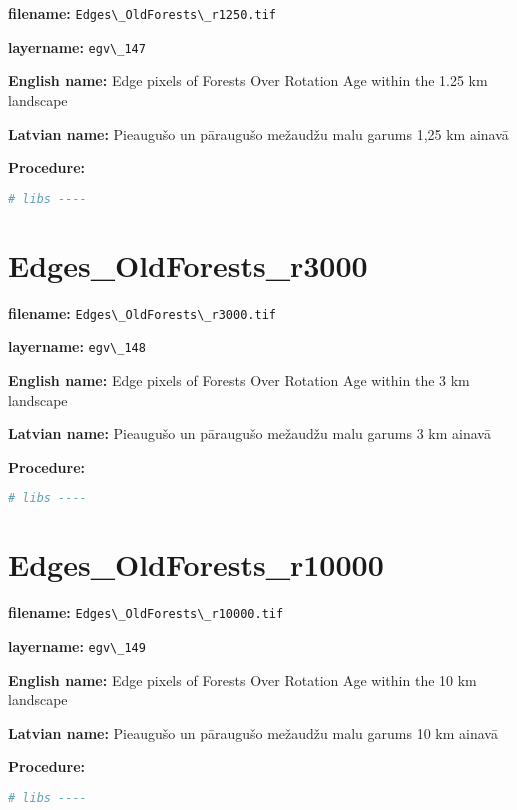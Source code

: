 \documentclass[
]{book}
\newcommand{\passthrough}[1]{#1}
\begin{document}
\textbf{filename:} \passthrough{\lstinline!Edges\_OldForests\_r1250.tif!}

\textbf{layername:} \passthrough{\lstinline!egv\_147!}

\textbf{English name:} Edge pixels of Forests Over Rotation Age within the 1.25 km landscape

\textbf{Latvian name:} Pieaugušo un pāraugušo mežaudžu malu garums 1,25 km ainavā

\textbf{Procedure:}

\begin{lstlisting}[language=R]
# libs ----
\end{lstlisting}

\section{Edges\_OldForests\_r3000}\label{ch06.148}

\textbf{filename:} \passthrough{\lstinline!Edges\_OldForests\_r3000.tif!}

\textbf{layername:} \passthrough{\lstinline!egv\_148!}

\textbf{English name:} Edge pixels of Forests Over Rotation Age within the 3 km landscape

\textbf{Latvian name:} Pieaugušo un pāraugušo mežaudžu malu garums 3 km ainavā

\textbf{Procedure:}

\begin{lstlisting}[language=R]
# libs ----
\end{lstlisting}

\section{Edges\_OldForests\_r10000}\label{ch06.149}

\textbf{filename:} \passthrough{\lstinline!Edges\_OldForests\_r10000.tif!}

\textbf{layername:} \passthrough{\lstinline!egv\_149!}

\textbf{English name:} Edge pixels of Forests Over Rotation Age within the 10 km landscape

\textbf{Latvian name:} Pieaugušo un pāraugušo mežaudžu malu garums 10 km ainavā

\textbf{Procedure:}

\begin{lstlisting}[language=R]
# libs ----
\end{lstlisting}
\end{document}
